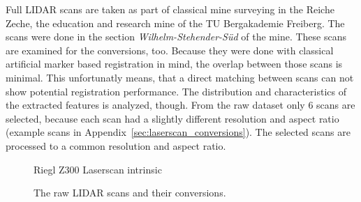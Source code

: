 Full \acrshort{LIDAR} scans are taken as part of classical mine surveying in the Reiche Zeche, the education and research mine of the TU Bergakademie Freiberg.
The scans were done in the section \emph{Wilhelm-Stehender-Süd} of the mine.
These scans are examined for the conversions, too.
Because they were done with classical artificial marker based registration in mind, the overlap between those scans is minimal.
This unfortunatly means, that a direct matching between scans can not show potential registration performance.
The distribution and characteristics of the extracted features is analyzed, though.
From the raw dataset only 6 scans are selected, because each scan had a slightly different resolution and aspect ratio (example scans in Appendix~\ref{sec:laserscan_conversions}).
The selected scans are processed to a common resolution and aspect ratio.
\begin{figure}[H]
\CenterFloatBoxes%
\begin{floatrow}
    {\caption{Riegl Z300 Laserscan intrinsic}\label{tab:scan_intrinsic}}%
    {\caption{The raw \acrshort{LIDAR} scans and their conversions.}\label{fig:scans}}
\end{floatrow}
\end{figure}

